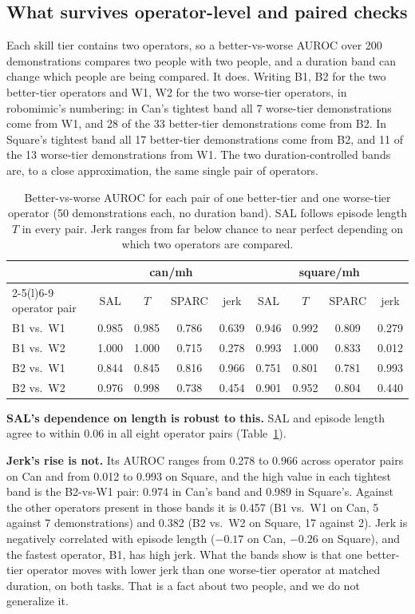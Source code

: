 \documentclass[10pt]{article}
\begin{document}
\subsection{What survives operator-level and paired checks}
\label{sec:operators}

Each skill tier contains two operators, so a better-vs-worse AUROC over 200
demonstrations compares two people with two people, and a duration band can
change which people are being compared. It does. Writing B1, B2 for the two
better-tier operators and W1, W2 for the two worse-tier operators, in
robomimic's numbering: in Can's tightest band all 7 worse-tier
demonstrations come from W1, and 28 of the 33 better-tier demonstrations
come from B2. In Square's tightest band all 17 better-tier demonstrations
come from B2, and 11 of the 13 worse-tier demonstrations from W1. The two
duration-controlled bands are, to a close approximation, the same single
pair of operators.

\begin{table}[t]
\centering
\small
\begin{tabular}{lcccccccc}
\toprule
& \multicolumn{4}{c}{can/mh} & \multicolumn{4}{c}{square/mh} \\
\cmidrule(lr){2-5}\cmidrule(l){6-9}
operator pair & SAL & $T$ & SPARC & jerk & SAL & $T$ & SPARC & jerk \\
\midrule
B1 vs.\ W1 & 0.985 & 0.985 & 0.786 & 0.639 & 0.946 & 0.992 & 0.809 & 0.279 \\
B1 vs.\ W2 & 1.000 & 1.000 & 0.715 & 0.278 & 0.993 & 1.000 & 0.833 & 0.012 \\
B2 vs.\ W1 & 0.844 & 0.845 & 0.816 & 0.966 & 0.751 & 0.801 & 0.781 & 0.993 \\
B2 vs.\ W2 & 0.976 & 0.998 & 0.738 & 0.454 & 0.901 & 0.952 & 0.804 & 0.440 \\
\bottomrule
\end{tabular}
\caption{Better-vs-worse AUROC for each pair of one better-tier and one
worse-tier operator (50 demonstrations each, no duration band). SAL follows
episode length $T$ in every pair. Jerk ranges from far below chance to near
perfect depending on which two operators are compared.}
\label{tab:operators}
\end{table}

\textbf{SAL's dependence on length is robust to this.} SAL and episode
length agree to within 0.06 in all eight operator pairs
(Table~\ref{tab:operators}).

\textbf{Jerk's rise is not.} Its AUROC ranges from 0.278 to 0.966 across
operator pairs on Can and from 0.012 to 0.993 on Square, and the high value
in each tightest band is the B2-vs-W1 pair: 0.974 in Can's band and 0.989 in
Square's. Against the other operators present in those bands it is 0.457
(B1 vs.\ W1 on Can, 5 against 7 demonstrations) and 0.382 (B2 vs.\ W2 on
Square, 17 against 2). Jerk is negatively correlated with episode length
($-0.17$ on Can, $-0.26$ on Square), and the fastest operator, B1, has high
jerk. What the bands show is that one better-tier operator moves with lower
jerk than one worse-tier operator at matched duration, on both tasks. That
is a fact about two people, and we do not generalize it.
\end{document}
